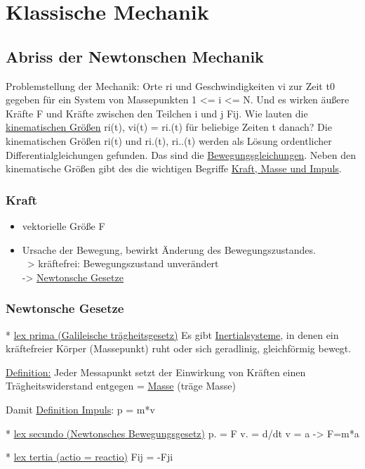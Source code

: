 \chapter{Klassische Mechanik}
\section{Abriss der Newtonschen Mechanik}
Problemstellung der Mechanik:
Orte ri und Geschwindigkeiten vi zur Zeit t0 gegeben f\"ur ein System von Massepunkten 1 <= i <= N. Und es wirken \"außere Kr\"afte F und Kr\"afte zwischen den Teilchen i und j Fij.
Wie lauten die \underline{kinematischen Gr\"oßen} ri(t), vi(t) = ri.(t) f\"ur beliebige Zeiten t danach?
Die kinematischen Gr\"oßen ri(t) und ri.(t), ri..(t) werden als L\"osung ordentlicher Differentialgleichungen gefunden. Das sind die \underline{Bewegungsgleichungen}.
Neben den kinematische Gr\"oßen gibt des die wichtigen Begriffe \underline{Kraft, Masse und Impuls}.

\subsection{Kraft}
\begin{itemize}
  \item vektorielle Gr\"oße F
  \item Ursache der Bewegung, bewirkt Änderung des Bewegungszustandes.\\
        ~> kr\"aftefrei: Bewegungszustand unver\"andert\\
        -> \underline{Newtonsche Gesetze}
\end{itemize}

\subsection{Newtonsche Gesetze}
* \underline{lex prima (Galileische tr\"agheitsgesetz)}
Es gibt \underline{Inertialsysteme}, in denen ein kr\"aftefreier K\"orper (Massepunkt) ruht oder sich geradlinig, gleichf\"ormig bewegt.

\underline{Definition:} Jeder Messapunkt setzt der Einwirkung von Kr\"aften einen Tr\"agheitswiderstand entgegen = \underline{Masse} (tr\"age Masse)

Damit \underline{Definition Impuls}:
p = m*v

* \underline{lex secundo (Newtonsches Bewegungsgesetz)}
p. = F
v. = d/dt v = a -> F=m*a

* \underline{lex tertia (actio = reactio)}
Fij = -Fji

